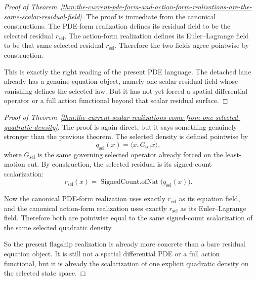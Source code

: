 \begin{proof}[Proof of Theorem~\ref{thm:the-current-pde-form-and-action-form-realizations-are-the-same-scalar-residual-field}]
\label{proof:thm:the-current-pde-form-and-action-form-realizations-are-the-same-scalar-residual-field}
The proof is immediate from the canonical constructions. The PDE-form
realization defines its residual field to be the selected residual
\(r_{\mathrm{sel}}\). The action-form realization defines its Euler--Lagrange
field to be that same selected residual \(r_{\mathrm{sel}}\). Therefore the
two fields agree pointwise by construction.

This is exactly the right reading of the present PDE language. The detached
lane already has a genuine equation object, namely one scalar residual field
whose vanishing defines the selected law. But it has not yet forced a spatial
differential operator or a full action functional beyond that scalar residual
surface.
\end{proof}

\begin{proof}[Proof of Theorem~\ref{thm:the-current-scalar-realizations-come-from-one-selected-quadratic-density}]
\label{proof:thm:the-current-scalar-realizations-come-from-one-selected-quadratic-density}
The proof is again direct, but it says something genuinely stronger than the
previous theorem. The selected density is defined pointwise by
\[
q_{\mathrm{sel}}(x)=\langle x,G_{\mathrm{sel}}x\rangle,
\]
where \(G_{\mathrm{sel}}\) is the same governing selected operator already
forced on the least-motion cut. By construction, the selected residual is its
signed-count scalarization:
\[
r_{\mathrm{sel}}(x)=\operatorname{SignedCount.ofNat}\!\bigl(q_{\mathrm{sel}}(x)\bigr).
\]

Now the canonical PDE-form realization uses exactly \(r_{\mathrm{sel}}\) as
its equation field, and the canonical action-form realization uses exactly
\(r_{\mathrm{sel}}\) as its Euler--Lagrange field. Therefore both are
pointwise equal to the same signed-count scalarization of the same selected
quadratic density.

So the present flagship realization is already more concrete than a bare
residual equation object. It is still not a spatial differential PDE or a full
action functional, but it is already the scalarization of one explicit
quadratic density on the selected state space.
\end{proof}

